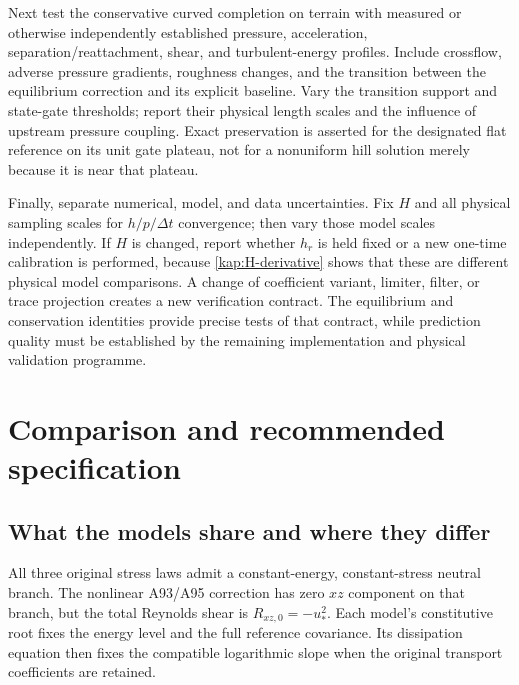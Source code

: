\documentclass[11pt,a4paper]{article}
\numberwithin{equation}{section}
\newcommand{\ust}{u_*}
\begin{document}
Next test the conservative curved completion on terrain with
measured or otherwise independently established pressure,
acceleration, separation/reattachment, shear, and turbulent-energy
profiles.  Include crossflow, adverse pressure gradients, roughness
changes, and the transition between the equilibrium correction and
its explicit baseline.  Vary the transition support and state-gate
thresholds; report their physical length scales and the influence
of upstream pressure coupling.  Exact preservation is asserted for
the designated flat reference on its unit gate plateau, not for a
nonuniform hill solution merely because it is near that plateau.

Finally, separate numerical, model, and data uncertainties.  Fix
$H$ and all physical sampling scales for $h/p/\Delta t$ convergence;
then vary those model scales independently.  If $H$ is changed,
report whether $h_r$ is held fixed or a new one-time calibration
is performed, because \cref{kap:H-derivative} shows that these are
different physical model comparisons.  A change of coefficient
variant, limiter, filter, or trace projection creates a new
verification contract.  The equilibrium and conservation identities
provide precise tests of that contract, while prediction quality
must be established by the remaining implementation and physical
validation programme.

\section{Comparison and recommended specification}
\label{sec:specification}

\subsection{What the models share and where they differ}

All three original stress laws admit a constant-energy, constant-stress
neutral branch. The nonlinear A93/A95 correction has zero $xz$
component on that branch, but the total Reynolds shear is
$R_{xz,0}=-\ust^2$. Each model's constitutive root fixes the energy
level and the full reference covariance. Its dissipation equation
then fixes the compatible logarithmic slope when the original
transport coefficients are retained.
\end{document}
